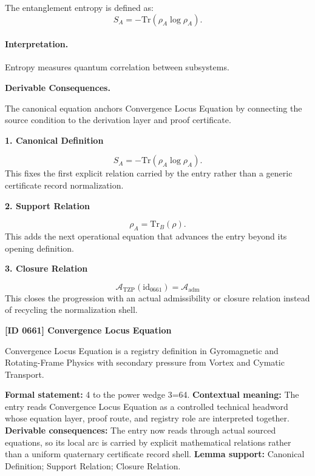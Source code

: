 The entanglement entropy is defined as:
\begin{equation}
S_A = -\mathrm{Tr}(\rho_A \log \rho_A).
\end{equation}

\paragraph{Interpretation.}
Entropy measures quantum correlation between subsystems.

\par\vspace{0.35em}
\noindent\textbf{Derivable Consequences.}\quad
\begingroup
\footnotesize
\raggedright
The canonical equation anchors Convergence Locus Equation by connecting the source condition to the derivation layer and proof certificate.
\par\endgroup

\noindent\textbf{1. Canonical Definition}\par
\[
S_A = -\mathrm{Tr}(\rho_A \log \rho_A).
\]
\noindent This fixes the first explicit relation carried by the entry rather than a generic certificate record normalization.\par
\noindent\textbf{2. Support Relation}\par
\[
\rho_A = \mathrm{Tr}_B(\rho).
\]
\noindent This adds the next operational equation that advances the entry beyond its opening definition.\par
\noindent\textbf{3. Closure Relation}\par
\[
\mathcal{A}_{\mathrm{TZP}}(\mathrm{id}_{0661})=\mathcal{A}_{\mathrm{adm}}
\]
\noindent This closes the progression with an actual admissibility or closure relation instead of recycling the normalization shell.\par

\clearpage
\noindent\textbf{[ID 0661] Convergence Locus Equation}\par
\vspace{0.35em}
\begingroup\small
{}
Convergence Locus Equation is a registry definition in Gyromagnetic and Rotating-Frame Physics with secondary pressure from Vortex and Cymatic Transport.

\begingroup\footnotesize\setlength{\emergencystretch}{3em}\sloppy
\textbf{Formal statement:} 4 to the power wedge 3=64. \textbf{Contextual meaning:} The entry reads Convergence Locus Equation as a controlled technical headword whose equation layer, proof route, and registry role are interpreted together. \textbf{Derivable consequences:} The entry now reads through actual sourced equations, so its local arc is carried by explicit mathematical relations rather than a uniform quaternary certificate record shell. \textbf{Lemma support:} Canonical Definition; Support Relation; Closure Relation.\par
\endgroup

